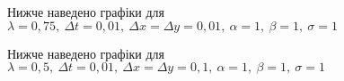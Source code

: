 Нижче наведено графіки для $\lambda = 0,75,\ \Delta t =0,01,\ \Delta x=\Delta y=0,01,\ \alpha =1,\ \beta=1,\ \sigma=1$
\vspace{20pt}
\newpage
\vspace{25pt}
\newpage
\vspace{25pt}

Нижче наведено графіки для $\lambda = 0,5,\ \Delta t =0,01,\ \Delta x=\Delta y=0,1,\ \alpha =1,\ \beta=1,\ \sigma=1$
\vspace{20pt}
\newpage
\vspace{25pt}
